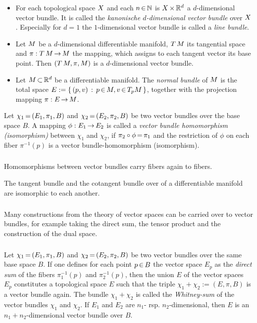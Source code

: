\documentclass[11pt,twoside]{article}
\begin{document}
\begin{examples}
\begin{itemize}[leftmargin=15pt]
\item[1.]
For each topological space $X$ and each $n {\,\in\,} {\mathbb{N}}$
is $X {\,\times\,} {\mathbb{R}}^d$ a $d$-dimensional vector bundle.
It is called the \textit{kanonische $d$-dimensional vector bundle} over $X$.
Especially for $d=1$
the $1$-dimensional vector bundle is called a \textit{line bundle}.
\item[2.]
Let ${M}$ be a $d$-dimensional differentiable manifold,
$T\,{M}$ its tangential space and $\pi:T\,{M} {\,\to\,} {M}$ the mapping,
which assigns to each tangent vector its base point.
Then $(T\,{M},\pi,{M})$ is a $d$-dimensional vector bundle.
\item[3.]
Let ${M} {\,\subset\,} {\mathbb{R}}^d$ be a differentiable manifold.
The \textit{normal bundle} of ${M}$ is the total space $E := \{ \, (p,v) \,: \, p {\,\in\,} {M}, v {\,\in\,} T_p {M} \, \}$,
together with the projection mapping $\pi: E {\,\to\,} {M}$.
\end{itemize}
\end{examples}

\begin{definition}
Let $\chi_1 {\,=\,} (E_1,\pi_1,B)$ and $\chi_2 {\,=\,} (E_2,\pi_2,B)$
be two vector bundles over the base space $B$.
A mapping $\phi:E_1 {\,\to\,} E_2$ is called a
\textit{vector bundle homomorphism (isomorphism)}
between $\chi_1$ and $\chi_2$,
if $\pi_2 \circ \phi {\,=\,} \pi_1$
and the restriction of $\phi$ on each fiber $\pi^{-1}(p)$
is a vector bundle-homomorphism (isomorphism).
\end{definition}

\subparagraph{}
Homomorphisms between vector bundles carry fibers again to fibers.

\begin{example}
The tangent bundle and the cotangent bundle over of a differentiable
manifold are isomorphic to each another.
\end{example}

\subparagraph{}
Many constructions from the theory of vector spaces can be carried over
to vector bundles,
for example
taking the direct sum,
the tensor product and the construction of the dual space.

\subparagraph{}
Let $\chi_1 {\,=\,} (E_1,\pi_1,B)$ and $\chi_2 {\,=\,} (E_2,\pi_2,B)$ be two
vector bundles over the same base space $B$.
If one defines for each point $p {\,\in\,} B$ the vector space $E_p$ as
the \textit{direct sum} of the fibers $\pi_1^{-1}(p)$ and $\pi_2^{-1}(p)$,
then the union $E$ of the vector spaces $E_p$ constitutes
a topological space $E$
such that the triple $\chi_1 + \chi_2 := (E,\pi,B)$
is a vector bundle again.
The bundle $\chi_1 + \chi_2$ is called the \textit{Whitney-sum} of
the vector bundles $\chi_1$ and $\chi_2$.
If $E_1$ and $E_2$ are $n_1$- rsp. $n_2$-dimensional,
then $E$ is an $n_1+n_2$-dimensional vector bundle over $B$.
\end{document}
